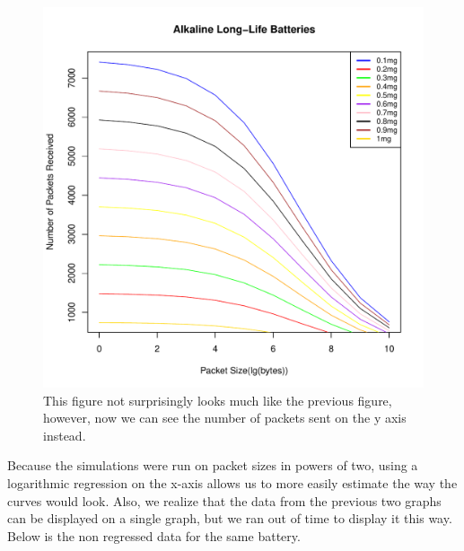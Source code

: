 \begin{figure}[h!]
\centering
{}
\includegraphics[width = \linewidth]{Figures/BatteryDepletionPackets/Log/ALLiBATpkt.pdf}
\caption{This figure not surprisingly looks much like the previous figure, however, now we can see the number of packets sent on the y axis instead.}
\end{figure}

Because the simulations were run on packet sizes in powers of two, using a logarithmic regression on the x-axis allows us to more easily estimate the way the curves would look. Also, we realize that the data from the previous two graphs can be displayed on a single graph, but we ran out of time to display it this way. Below is the non regressed data for the same battery. 

